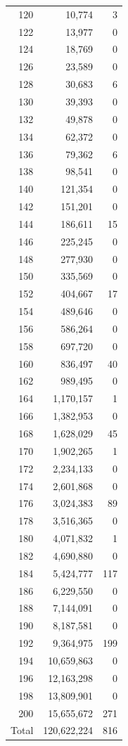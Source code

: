 \documentclass[11pt]{amsart}
\begin{document}
\begin{longtable}{rrr}
120 & 10,774 & 3 \\
122 & 13,977 & 0 \\
124 & 18,769 & 0 \\
126 & 23,589 & 0 \\
128 & 30,683 & 6 \\
130 & 39,393 & 0 \\
132 & 49,878 & 0 \\
134 & 62,372 & 0 \\
136 & 79,362 & 6 \\
138 & 98,541 & 0 \\
140 & 121,354 & 0 \\
142 & 151,201 & 0 \\
144 & 186,611 & 15 \\
146 & 225,245 & 0 \\
148 & 277,930 & 0 \\
150 & 335,569 & 0 \\
152 & 404,667 & 17 \\
154 & 489,646 & 0 \\
156 & 586,264 & 0 \\
158 & 697,720 & 0 \\
160 & 836,497 & 40 \\
162 & 989,495 & 0 \\
164 & 1,170,157 & 1 \\
166 & 1,382,953 & 0 \\
168 & 1,628,029 & 45 \\
170 & 1,902,265 & 1 \\
172 & 2,234,133 & 0 \\
174 & 2,601,868 & 0 \\
176 & 3,024,383 & 89 \\
178 & 3,516,365 & 0 \\
180 & 4,071,832 & 1 \\
182 & 4,690,880 & 0 \\
184 & 5,424,777 & 117 \\
186 & 6,229,550 & 0 \\
188 & 7,144,091 & 0 \\
190 & 8,187,581 & 0 \\
192 & 9,364,975 & 199 \\
194 & 10,659,863 & 0 \\
196 & 12,163,298 & 0 \\
198 & 13,809,901 & 0 \\
200 & 15,655,672 & 271 \\
\midrule Total & 120,622,224 & 816\\\bottomrule
\end{longtable}
\end{document}
